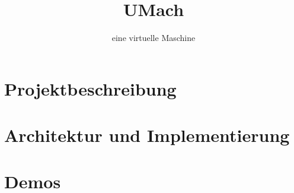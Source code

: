 \documentclass{beamer}
\title{UMach}
\subtitle{eine virtuelle Maschine}
\author{}
\institute{Georg-Simon-Ohm-Hochschule}
\date{}
\begin{document}
\frame{\titlepage}



\part{Projektbeschreibung}


\part{Architektur und Implementierung}


% 

%

\part{Demos}

\end{document}
